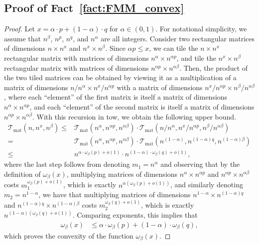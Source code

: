 \documentclass[11pt]{article}
\newcommand{\Tmat}{\mathcal{T}_{\mathrm{mat}}}
\begin{document}
\subsection*{Proof of Fact~\ref{fact:FMM_convex}}

\begin{proof}
Let $x = \alpha \cdot p + (1-\alpha) \cdot q$ for $\alpha \in (0,1)$. For notational simplicity, we assume that $n^{\beta}$, $n^p$, $n^q$, and $n^{\alpha}$ are all integers. 
Consider two rectangular matrices of dimensions $n \times n^x$ and $n^x \times n^{\beta}$. Since $\alpha  p \leq x$, we can tile the $n \times n^x$ rectangular matrix with matrices of dimensions $n^{\alpha} \times n^{\alpha  p}$, and tile the $n^x \times n^{\beta}$ rectangular matrix with matrices of dimensions $n^{\alpha p} \times n^{\alpha  \beta}$. Then, the  product of the two tiled matrices can be obtained by viewing it as a multiplication of a matrix of dimensions $n/n^{\alpha} \times n^{x}/n^{\alpha  p}$ with a matrix of dimensions $n^{x}/n^{\alpha  p} \times n^{\beta} / n^{\alpha \beta}$, where each ``element'' of the first matrix is itself a matrix of dimensions $n^{\alpha} \times n^{\alpha  p}$, and each ``element'' of the second matrix is itself a matrix of dimensions $n^{\alpha p} \times n^{\alpha  \beta}$. With this recursion in tow, we obtain the following upper bound. 
\begin{align*}
\Tmat(n, n^x, n^{\beta}) 
\leq & \Tmat(n^{\alpha}, n^{\alpha p}, n^{\alpha \beta}) \cdot \Tmat(n/n^\alpha, n^x/n^{\alpha  p}, n^{\beta} / n^{\alpha \beta}) \\
= & \Tmat(n^{\alpha}, n^{\alpha  p}, n^{\alpha \beta}) \cdot \Tmat(n^{(1-\alpha)}, n^{(1-\alpha) q}, n^{(1-\alpha) \beta})\\
\leq & n^{\alpha \cdot \omega_{\beta}(p) + o(1)} \cdot n^{(1-\alpha) \cdot \omega_{\beta}(q) + o (1)},
\end{align*} 
where the last step follows from denoting $m_1 = n^\alpha$ and  observing that by the definition of $\omega_{\beta}(x)$, multiplying matrices of dimensions $n^\alpha \times n^{\alpha p}$ and $n^{\alpha p} \times n^{\alpha \beta}$ costs $m_1^{\omega_{\beta}(p) + o(1)}$, which is exactly $n^{\alpha (\omega_{\beta}(p) + o(1))}$, and similarly denoting $m_2 = n^{1-\alpha}$, we have that multiplying matrices of dimensions $n^{1-\alpha} \times n^{(1-\alpha) q}$ and $n^{(1-\alpha) q} \times n^{(1-\alpha) \beta}$ costs $m_2^{\omega_{\beta}(q) + o(1)}$, which is exactly $n^{(1-\alpha) (\omega_{\beta}(q) + o(1))}$. Comparing exponents, this implies that 
\begin{align*}
\omega_{\beta}(x) &\leq \alpha\cdot\omega_{\beta}(p) + (1-\alpha)\cdot \omega_{\beta}(q) ,
\end{align*} 
which proves the convexity of the function $\omega_{\beta}(x)$. 
\end{proof}
\end{document}
